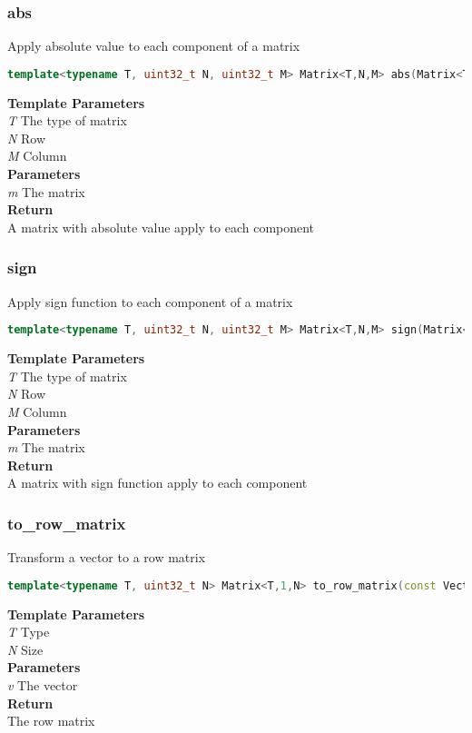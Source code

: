 \subsubsection{abs}
\begin{mdframed}
Apply absolute value to each component of a matrix
\begin{lstlisting}[language=C++]
template<typename T, uint32_t N, uint32_t M> Matrix<T,N,M> abs(Matrix<T,N,M> m) 
\end{lstlisting}
\textbf{Template Parameters} \\ 
\textit{T} The type of matrix \\ 
\textit{N} Row \\ 
\textit{M} Column \\ 
\textbf{Parameters} \\ 
\textit{m} The matrix \\ 
\textbf{Return} \\ 
A matrix with absolute value apply to each component\\ 
\end{mdframed}

\subsubsection{sign}
\begin{mdframed}
Apply sign function to each component of a matrix
\begin{lstlisting}[language=C++]
template<typename T, uint32_t N, uint32_t M> Matrix<T,N,M> sign(Matrix<T,N,M> m) 
\end{lstlisting}
\textbf{Template Parameters} \\ 
\textit{T} The type of matrix \\ 
\textit{N} Row \\ 
\textit{M} Column \\ 
\textbf{Parameters} \\ 
\textit{m} The matrix \\ 
\textbf{Return} \\ 
A matrix with sign function apply to each component\\ 
\end{mdframed}

\subsubsection{to\_row\_matrix}
\begin{mdframed}
Transform a vector to a row matrix
\begin{lstlisting}[language=C++]
template<typename T, uint32_t N> Matrix<T,1,N> to_row_matrix(const Vector<T,N>& v) 
\end{lstlisting}
\textbf{Template Parameters} \\ 
\textit{T} Type \\ 
\textit{N} Size \\ 
\textbf{Parameters} \\ 
\textit{v} The vector \\ 
\textbf{Return} \\ 
The row matrix\\ 
\end{mdframed}

